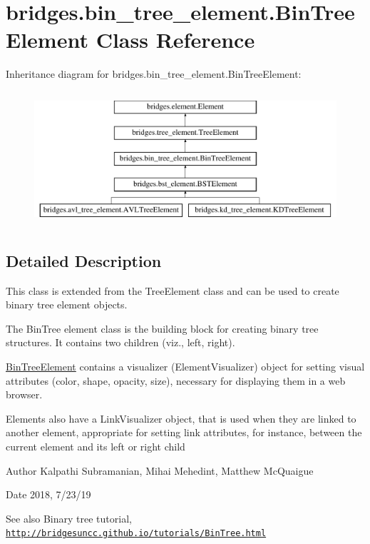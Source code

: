 \hypertarget{classbridges_1_1bin__tree__element_1_1_bin_tree_element}{}\section{bridges.\+bin\+\_\+tree\+\_\+element.\+Bin\+Tree\+Element Class Reference}
\label{classbridges_1_1bin__tree__element_1_1_bin_tree_element}
Inheritance diagram for bridges.\+bin\+\_\+tree\+\_\+element.\+Bin\+Tree\+Element\+:\begin{figure}[H]
\begin{center}
\leavevmode
\includegraphics[height=5.000000cm]{classbridges_1_1bin__tree__element_1_1_bin_tree_element}
\end{center}
\end{figure}


\subsection{Detailed Description}
This class is extended from the Tree\+Element class and can be used to create binary tree element objects. 

The Bin\+Tree element class is the building block for creating binary tree structures. It contains two children (viz., left, right).

\hyperlink{classbridges_1_1bin__tree__element_1_1_bin_tree_element}{Bin\+Tree\+Element} contains a visualizer (Element\+Visualizer) object for setting visual attributes (color, shape, opacity, size), necessary for displaying them in a web browser.

Elements also have a Link\+Visualizer object, that is used when they are linked to another element, appropriate for setting link attributes, for instance, between the current element and its left or right child

\begin{DoxyAuthor}{Author}
Kalpathi Subramanian, Mihai Mehedint, Matthew Mc\+Quaigue
\end{DoxyAuthor}
\begin{DoxyDate}{Date}
2018, 7/23/19
\end{DoxyDate}
\begin{DoxySeeAlso}{See also}
Binary tree tutorial, \href{http://bridgesuncc.github.io/tutorials/BinTree.html}{\tt http\+://bridgesuncc.\+github.\+io/tutorials/\+Bin\+Tree.\+html} 
\end{DoxySeeAlso}
